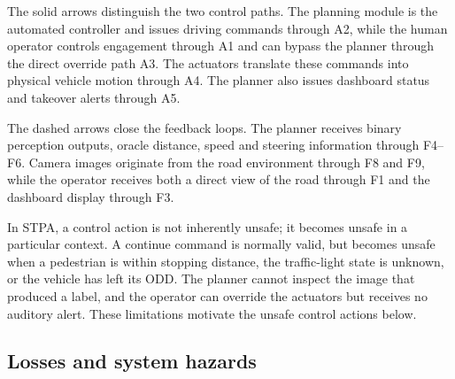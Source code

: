 \documentclass[nologo,a4paper,12pt]{article}
\begin{document}
The solid arrows distinguish the two control paths. The planning module is the automated
controller and issues driving commands through A2, while the human operator controls engagement
through A1 and can bypass the planner through the direct override path A3. The actuators translate
these commands into physical vehicle motion through A4. The planner also issues dashboard status
and takeover alerts through A5.

The dashed arrows close the feedback loops. The planner receives binary perception outputs,
oracle distance, speed and steering information through F4--F6. Camera images originate from the
road environment through F8 and F9, while the operator receives both a direct view of the road
through F1 and the dashboard display through F3.

In STPA, a control action is not inherently unsafe; it becomes unsafe in a particular context. A
continue command is normally valid, but becomes unsafe when a pedestrian is within stopping
distance, the traffic-light state is unknown, or the vehicle has left its ODD. The planner cannot
inspect the image that produced a label, and the operator can override the actuators but receives
no auditory alert. These limitations motivate the unsafe control actions below.

\subsection{Losses and system hazards}
\end{document}
